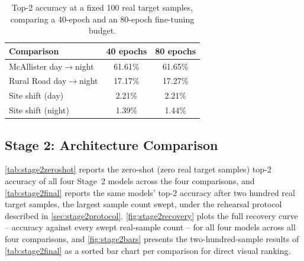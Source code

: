 \documentclass{iutbscthesis}
\begin{document}
\begin{table}[H]
    \centering
    \begin{tabular}{l c c}
        \toprule
        Comparison & 40 epochs & 80 epochs \\
        \midrule
        McAllister day$\to$night & 61.61\% & 61.65\% \\
        Rural Road day$\to$night & 17.17\% & 17.27\% \\
        Site shift (day) & 2.21\% & 2.21\% \\
        Site shift (night) & 1.39\% & 1.44\% \\
        \bottomrule
    \end{tabular}
    \caption{Top-2 accuracy at a fixed 100 real target samples, comparing a 40-epoch and an 80-epoch fine-tuning budget.}
    \label{tab:epochablation}
\end{table}

\subsection{Stage 2: Architecture Comparison}
\label{sec:stage2results}

\autoref{tab:stage2zeroshot} reports the zero-shot (zero real target samples) top-2 accuracy of all four Stage~2 models across the four comparisons, and \autoref{tab:stage2final} reports the same models' top-2 accuracy after two hundred real target samples, the largest sample count swept, under the rehearsal protocol described in \autoref{sec:stage2protocol}. \autoref{fig:stage2recovery} plots the full recovery curve -- accuracy against every swept real-sample count -- for all four models across all four comparisons, and \autoref{fig:stage2bars} presents the two-hundred-sample results of \autoref{tab:stage2final} as a sorted bar chart per comparison for direct visual ranking.
\end{document}
